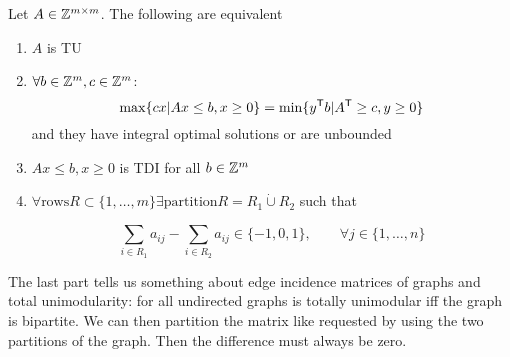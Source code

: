 \begin{thm} Let $A\in \mathbb{Z}^{m\times m}$. The following are equivalent
\begin{enumerate}
\item $A$ is TU
\item $\forall b \in \mathbb{Z}^m, c\in \mathbb{Z}^m$:
\[\max \{cx|Ax\leq b, x\geq 0\} = \min \{{y}^\text{\upshape \sffamily T} b|{A}^\text{\upshape \sffamily T} \geq c, y\geq 0\}\]
and they have integral optimal solutions or are unbounded
\item $Ax\leq b, x\geq 0$ is TDI for all $b\in \mathbb{Z}^m$
\item $\forall \text{rows} R\subset \{1,\ldots, m\} \exists \text{partition} R = R_1 \dot \cup R_2$ such that

\[\sum_{i\in R_1} a_{ij} - \sum_{i\in R_2} a_{ij} \in \{-1,0,1\}, \qquad \forall j\in \{1,\ldots, n\}\]
\end{enumerate}
\end{thm}

The last part tells us something about edge incidence matrices of graphs and total unimodularity: for all undirected graphs is totally unimodular iff the graph is bipartite. We can then partition the matrix like requested by using the two partitions of the graph. Then the difference must always be zero.